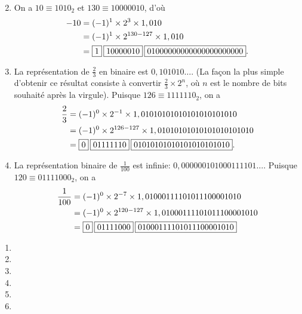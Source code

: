 \begin{exercice}
\begin{sol}
\begin{enumerate}
\begin{align*}
      \end{align*}
    \item On a $10 \equiv 1010_2$ et $130 \equiv
      10000010$, d'où
      \begin{align*}
        -10
        &= (-1)^1 \times 2^3 \times 1,010 \\
        &= (-1)^1 \times 2^{130 - 127} \times 1,010 \\
        &= \fbox{$1$}\hspace{2pt}\fbox{$10000010$}\hspace{2pt}\fbox{$01000000000000000000000$}.
      \end{align*}
    \item La représentation de $\frac{2}{3}$ en binaire est
      $0,101010\dots$. (La façon la plus simple d'obtenir ce résultat
      consiste à convertir $\frac{2}{3} \times 2^n$, où $n$ est le
      nombre de bits souhaité après la virgule). Puisque $126 \equiv
      1111110_2$, on a
      \begin{align*}
        \frac{2}{3}
        &= (-1)^0 \times 2^{-1} \times 1,01010101010101010101010 \\
        &= (-1)^0 \times 2^{126 - 127} \times 1,01010101010101010101010 \\
        &= \fbox{$0$}\hspace{2pt}\fbox{$01111110$}\hspace{2pt}\fbox{$01010101010101010101010$}.
      \end{align*}
    \item La représentation binaire de $\frac{1}{100}$ est infinie:
      $0,000000101000111101\dots$. Puisque $120 \equiv 01111000_2$, on
      a
      \begin{align*}
        \frac{1}{100}
        &= (-1)^0 \times 2^{-7} \times 1,01000111101011100001010 \\
        &= (-1)^0 \times 2^{120 - 127} \times 1,01000111101011100001010 \\
        &= \fbox{$0$}\hspace{2pt}\fbox{$01111000$}\hspace{2pt}\fbox{$01000111101011100001010$}
      \end{align*}
    \end{enumerate}
  \end{sol}
  \begin{rep}
    \begin{enumerate}
    \item {}
    \item {}
    \item {}
    \item {}
    \item {}
    \item {}
    \end{enumerate}
  \end{rep}
\end{exercice}

